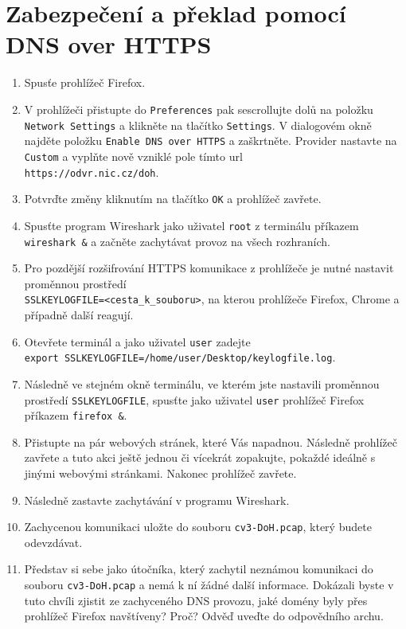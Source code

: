 \section{Zabezpečení a překlad pomocí DNS over HTTPS}
\begin{enumerate}
    \item Spusťe prohlížeč Firefox.
    \item V prohlížeči přistupte do \texttt{Preferences} pak sescrollujte dolů na položku \texttt{Network Settings} a klikněte na tlačítko \texttt{Settings}. V dialogovém okně najděte položku \texttt{Enable DNS over HTTPS} a zaškrtněte. Provider nastavte na \texttt{Custom} a vyplňte nově vzniklé pole tímto url\\ \texttt{https://odvr.nic.cz/doh}.
    \item Potvrďte změny kliknutím na tlačítko \texttt{OK} a prohlížeč zavřete.
    \item Spusťte program Wireshark jako uživatel \texttt{root} z terminálu příkazem \texttt{wireshark \&} a začněte zachytávat provoz na všech rozhraních.
    \item Pro pozdější rozšifrování HTTPS komunikace z prohlížeče je nutné nastavit proměnnou prostředí\\ \texttt{SSLKEYLOGFILE=<cesta\_k\_souboru>}, na kterou prohlížeče Firefox, Chrome a případně další reagují.
    \item Otevřete terminál a jako uživatel \texttt{user} zadejte\\ \texttt{export SSLKEYLOGFILE=/home/user/Desktop/keylogfile.log}.
    \item Následně ve stejném okně terminálu, ve kterém jste nastavili proměnnou prostředí \texttt{SSLKEYLOGFILE}, spusťte jako uživatel \texttt{user} prohlížeč Firefox příkazem \texttt{firefox \&}.
    \item Přistupte na pár webových stránek, které Vás napadnou. Následně prohlížeč zavřete a tuto akci ještě jednou či vícekrát zopakujte, pokaždé ideálně s jinými webovými stránkami. Nakonec prohlížeč zavřete.
    \item Následně zastavte zachytávání v programu Wireshark.
    \item Zachycenou komunikaci uložte do souboru \texttt{cv3-DoH.pcap}, který budete odevzdávat.
	\item Představ si sebe jako útočníka, který zachytil neznámou komunikaci do souboru \texttt{cv3-DoH.pcap} a nemá k ní žádné další informace. Dokázali byste v tuto chvíli zjistit ze zachyceného DNS provozu, jaké domény byly přes prohlížeč Firefox navštíveny? Proč? Odvěď uveďte do odpovědního archu.

\end{enumerate}
